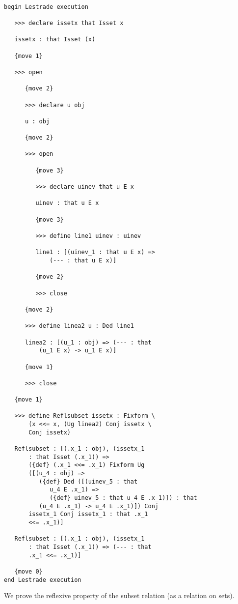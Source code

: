 \documentclass[12pt]{article}
\begin{document}
\begin{verbatim}

begin Lestrade execution

   >>> declare issetx that Isset x

   issetx : that Isset (x)

   {move 1}

   >>> open

      {move 2}

      >>> declare u obj

      u : obj

      {move 2}

      >>> open

         {move 3}

         >>> declare uinev that u E x

         uinev : that u E x

         {move 3}

         >>> define line1 uinev : uinev

         line1 : [(uinev_1 : that u E x) => 
             (--- : that u E x)]

         {move 2}

         >>> close

      {move 2}

      >>> define linea2 u : Ded line1

      linea2 : [(u_1 : obj) => (--- : that 
          (u_1 E x) -> u_1 E x)]

      {move 1}

      >>> close

   {move 1}

   >>> define Reflsubset issetx : Fixform \
       (x <<= x, (Ug linea2) Conj issetx \
       Conj issetx)

   Reflsubset : [(.x_1 : obj), (issetx_1 
       : that Isset (.x_1)) => 
       ({def} (.x_1 <<= .x_1) Fixform Ug 
       ([(u_4 : obj) => 
          ({def} Ded ([(uinev_5 : that 
             u_4 E .x_1) => 
             ({def} uinev_5 : that u_4 E .x_1)]) : that 
          (u_4 E .x_1) -> u_4 E .x_1)]) Conj 
       issetx_1 Conj issetx_1 : that .x_1 
       <<= .x_1)]

   Reflsubset : [(.x_1 : obj), (issetx_1 
       : that Isset (.x_1)) => (--- : that 
       .x_1 <<= .x_1)]

   {move 0}
end Lestrade execution
\end{verbatim}

We prove the reflexive property of the subset relation (as a relation on sets).
\end{document}
